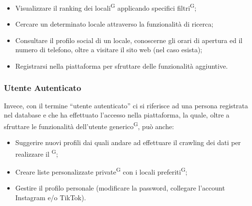 \begin{itemize}
  \item Visualizzare il ranking dei locali\textsuperscript{G} applicando specifici filtri\textsuperscript{G};
  \item Cercare un determinato locale attraverso la funzionalità di ricerca;
  \item Consultare il profilo social di un locale, conoscerne gli orari di apertura ed il numero di telefono, oltre a visitare il sito web (nel caso esista);
  \item Registrarsi nella piattaforma per sfruttare delle funzionalità aggiuntive.
\end{itemize}

\subsubsection{Utente Autenticato}

Invece, con il termine “utente autenticato” ci si riferisce ad una persona registrata nel database e che ha effettuato l'accesso nella piattaforma, la quale, oltre a sfruttare le funzionalità dell’utente generico\textsuperscript{G}, può anche:

\begin{itemize}
  \item Suggerire nuovi profili dai quali andare ad effettuare il crawling dei dati per realizzare il \textsuperscript{G};
  \item Creare liste personalizzate private\textsuperscript{G} con i locali preferiti\textsuperscript{G};
  \item Gestire il profilo personale (modificare la password, collegare l'account Instagram e/o TikTok).
\end{itemize}




